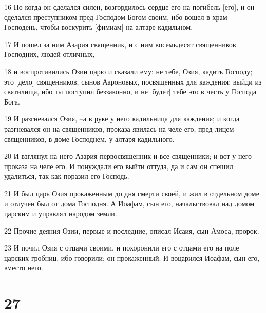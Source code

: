 \par 16 Но когда он сделался силен, возгордилось сердце его на погибель [его], и он сделался преступником пред Господом Богом своим, ибо вошел в храм Господень, чтобы воскурить [фимиам] на алтаре кадильном.
\par 17 И пошел за ним Азария священник, и с ним восемьдесят священников Господних, людей отличных,
\par 18 и воспротивились Озии царю и сказали ему: не тебе, Озия, кадить Господу; это [дело] священников, сынов Аароновых, посвященных для каждения; выйди из святилища, ибо ты поступил беззаконно, и не [будет] тебе это в честь у Господа Бога.
\par 19 И разгневался Озия, --а в руке у него кадильница для каждения; и когда разгневался он на священников, проказа явилась на челе его, пред лицем священников, в доме Господнем, у алтаря кадильного.
\par 20 И взглянул на него Азария первосвященник и все священники; и вот у него проказа на челе его. И понуждали его выйти оттуда, да и сам он спешил удалиться, так как поразил его Господь.
\par 21 И был царь Озия прокаженным до дня смерти своей, и жил в отдельном доме и отлучен был от дома Господня. А Иоафам, сын его, начальствовал над домом царским и управлял народом земли.
\par 22 Прочие деяния Озии, первые и последние, описал Исаия, сын Амоса, пророк.
\par 23 И почил Озия с отцами своими, и похоронили его с отцами его на поле царских гробниц, ибо говорили: он прокаженный. И воцарился Иоафам, сын его, вместо него.

\chapter{27}

